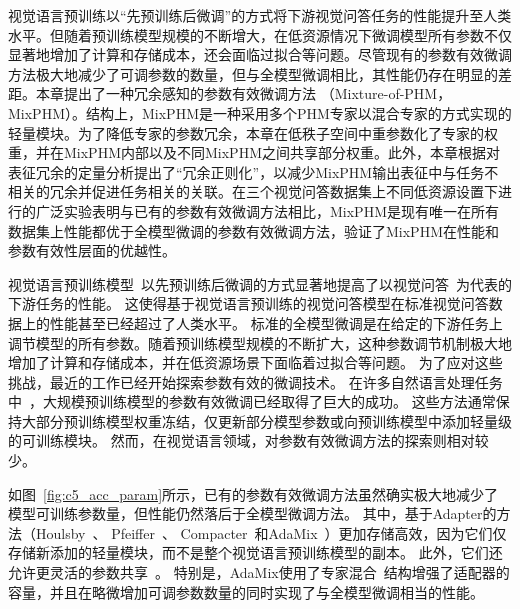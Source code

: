 

视觉语言预训练以“先预训练后微调”的方式将下游视觉问答任务的性能提升至人类水平。但随着预训练模型规模的不断增大，在低资源情况下微调模型所有参数不仅显著地增加了计算和存储成本，还会面临过拟合等问题。尽管现有的参数有效微调方法极大地减少了可调参数的数量，但与全模型微调相比，其性能仍存在明显的差距。本章提出了一种冗余感知的参数有效微调方法 （Mixture-of-PHM，MixPHM）。结构上，MixPHM是一种采用多个PHM专家以混合专家的方式实现的轻量模块。为了降低专家的参数冗余，本章在低秩子空间中重参数化了专家的权重，并在MixPHM内部以及不同MixPHM之间共享部分权重。此外，本章根据对表征冗余的定量分析提出了“冗余正则化”，以减少MixPHM输出表征中与任务不相关的冗余并促进任务相关的关联。在三个视觉问答数据集上不同低资源设置下进行的广泛实验表明与已有的参数有效微调方法相比，MixPHM是现有唯一在所有数据集上性能都优于全模型微调的参数有效微调方法，验证了MixPHM在性能和参数有效性层面的优越性。




视觉语言预训练模型~\cite{wang2022image,wang2022ofa,yuan2021florence,wang2021simvlm,wang2021vlmo,dou2022empirical,li2022blip}以先预训练后微调的方式显著地提高了以视觉问答~\cite{antol2015vqa}为代表的下游任务的性能。
这使得基于视觉语言预训练的视觉问答模型在标准视觉问答数据上的性能甚至已经超过了人类水平。
标准的全模型微调是在给定的下游任务上调节模型的所有参数。随着预训练模型规模的不断扩大，这种参数调节机制极大地增加了计算和存储成本，并在低资源场景下面临着过拟合等问题。
为了应对这些挑战，最近的工作已经开始探索参数有效的微调技术。
在许多自然语言处理任务中~\cite{mahabadi2021parameter,yang2022prompt,ruckle2021adapterdrop,mao2022unipelt,he2022towards,yang2022robust,zhang2022differentiable}，大规模预训练模型的参数有效微调已经取得了巨大的成功。
这些方法通常保持大部分预训练模型权重冻结，仅更新部分模型参数或向预训练模型中添加轻量级的可训练模块。
然而，在视觉语言领域，对参数有效微调方法的探索则相对较少。


如图~\ref{fig:c5_acc_param}所示，已有的参数有效微调方法虽然确实极大地减少了模型可训练参数量，但性能仍然落后于全模型微调方法。
其中，基于Adapter的方法（Houlsby~\cite{houlsby2019parameter}、 Pfeiffer~\cite{pfeiffer2020adapterfusion}、 Compacter~\cite{karimi2021compacter}和AdaMix~\cite{wang2022adamix}）更加存储高效，因为它们仅存储新添加的轻量模块，而不是整个视觉语言预训练模型的副本。
此外，它们还允许更灵活的参数共享~\cite{sung2022vl}。
特别是，AdaMix使用了专家混合~\cite{shazeer2017outrageously}结构增强了适配器的容量，并且在略微增加可调参数数量的同时实现了与全模型微调相当的性能。



